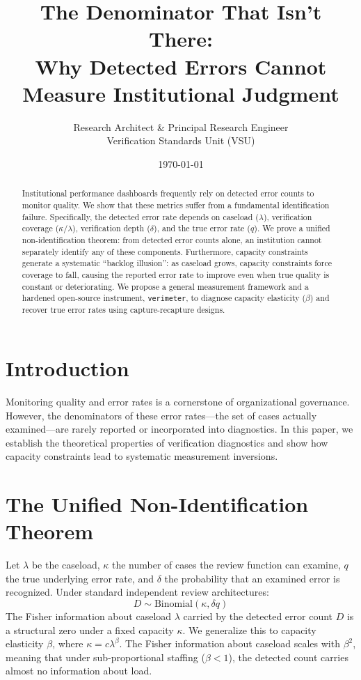 \documentclass[11pt]{article}
\title{The Denominator That Isn't There:\\Why Detected Errors Cannot Measure Institutional Judgment}
\author{Research Architect \& Principal Research Engineer\\Verification Standards Unit (VSU)}
\date{\today}
\begin{document}
\maketitle

\begin{abstract}
Institutional performance dashboards frequently rely on detected error counts to monitor quality. We show that these metrics suffer from a fundamental identification failure. Specifically, the detected error rate depends on caseload ($\lambda$), verification coverage ($\kappa/\lambda$), verification depth ($\delta$), and the true error rate ($q$). We prove a unified non-identification theorem: from detected error counts alone, an institution cannot separately identify any of these components. Furthermore, capacity constraints generate a systematic ``backlog illusion'': as caseload grows, capacity constraints force coverage to fall, causing the reported error rate to improve even when true quality is constant or deteriorating. We propose a general measurement framework and a hardened open-source instrument, \texttt{verimeter}, to diagnose capacity elasticity ($\beta$) and recover true error rates using capture-recapture designs.
\end{abstract}

\section{Introduction}
Monitoring quality and error rates is a cornerstone of organizational governance. However, the denominators of these error rates—the set of cases actually examined—are rarely reported or incorporated into diagnostics. In this paper, we establish the theoretical properties of verification diagnostics and show how capacity constraints lead to systematic measurement inversions.

\section{The Unified Non-Identification Theorem}
Let $\lambda$ be the caseload, $\kappa$ the number of cases the review function can examine, $q$ the true underlying error rate, and $\delta$ the probability that an examined error is recognized. Under standard independent review architectures:
\begin{equation}
D \sim \text{Binomial}(\kappa, \delta q)
\end{equation}
The Fisher information about caseload $\lambda$ carried by the detected error count $D$ is a structural zero under a fixed capacity $\kappa$. We generalize this to capacity elasticity $\beta$, where $\kappa = c \lambda^\beta$. The Fisher information about caseload scales with $\beta^2$, meaning that under sub-proportional staffing ($\beta < 1$), the detected count carries almost no information about load.
\end{document}
